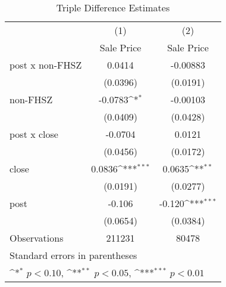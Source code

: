\begin{table}[htbp]\centering
\def\sym#1{\ifmmode^{#1}\else\(^{#1}\)\fi}
\caption{Triple Difference Estimates\label{tabl}}
\begin{tabular}{l*{2}{c}}
\hline\hline
                    &\multicolumn{1}{c}{(1)}&\multicolumn{1}{c}{(2)}\\
                    &\multicolumn{1}{c}{Sale Price}&\multicolumn{1}{c}{Sale Price}\\
\hline
post x non-FHSZ     &      0.0414         &    -0.00883         \\
                    &    (0.0396)         &    (0.0191)         \\
[1em]
non-FHSZ            &     -0.0783\sym{*}  &    -0.00103         \\
                    &    (0.0409)         &    (0.0428)         \\
[1em]
post x close        &     -0.0704         &      0.0121         \\
                    &    (0.0456)         &    (0.0172)         \\
[1em]
close               &      0.0836\sym{***}&      0.0635\sym{**} \\
                    &    (0.0191)         &    (0.0277)         \\
[1em]
post                &      -0.106         &      -0.120\sym{***}\\
                    &    (0.0654)         &    (0.0384)         \\
\hline
Observations        &      211231         &       80478         \\
\hline\hline
\multicolumn{3}{l}{\footnotesize Standard errors in parentheses}\\
\multicolumn{3}{l}{\footnotesize \sym{*} \(p<0.10\), \sym{**} \(p<0.05\), \sym{***} \(p<0.01\)}\\
\end{tabular}
\end{table}
